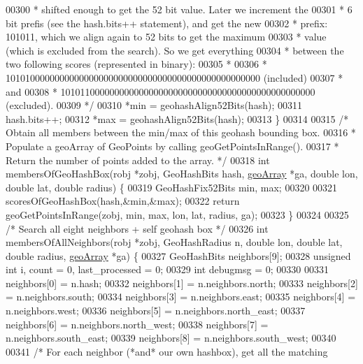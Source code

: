 \begin{DoxyCode}
{{00300 \textcolor{comment}{     * shifted enough to get the 52 bit value. Later we increment the}
00301 \textcolor{comment}{     * 6 bit prefis (see the hash.bits++ statement), and get the new}
00302 \textcolor{comment}{     * prefix: 101011, which we align again to 52 bits to get the maximum}
00303 \textcolor{comment}{     * value (which is excluded from the search). So we get everything}
00304 \textcolor{comment}{     * between the two following scores (represented in binary):}
00305 \textcolor{comment}{     *}
00306 \textcolor{comment}{     * 1010100000000000000000000000000000000000000000000000 (included)}
00307 \textcolor{comment}{     * and}
00308 \textcolor{comment}{     * 1010110000000000000000000000000000000000000000000000 (excluded).}
00309 \textcolor{comment}{     */}
00310     *min = geohashAlign52Bits(hash);
00311     hash.bits++;
00312     *max = geohashAlign52Bits(hash);
00313 \}
00314 
00315 \textcolor{comment}{/* Obtain all members between the min/max of this geohash bounding box.}
00316 \textcolor{comment}{ * Populate a geoArray of GeoPoints by calling geoGetPointsInRange().}
00317 \textcolor{comment}{ * Return the number of points added to the array. */}
00318 \textcolor{keywordtype}{int} membersOfGeoHashBox(robj *zobj, GeoHashBits hash, \hyperlink{structgeoArray}{geoArray} *ga, \textcolor{keywordtype}{double} lon, \textcolor{keywordtype}{double} lat, \textcolor{keywordtype}{
      double} radius) \{
00319     GeoHashFix52Bits min, max;
00320 
00321     scoresOfGeoHashBox(hash,&min,&max);
00322     \textcolor{keywordflow}{return} geoGetPointsInRange(zobj, min, max, lon, lat, radius, ga);
00323 \}
00324 
00325 \textcolor{comment}{/* Search all eight neighbors + self geohash box */}
00326 \textcolor{keywordtype}{int} membersOfAllNeighbors(robj *zobj, GeoHashRadius n, \textcolor{keywordtype}{double} lon, \textcolor{keywordtype}{double} lat, \textcolor{keywordtype}{double} radius, 
      \hyperlink{structgeoArray}{geoArray} *ga) \{
00327     GeoHashBits neighbors[9];
00328     \textcolor{keywordtype}{unsigned} \textcolor{keywordtype}{int} i, count = 0, last\_processed = 0;
00329     \textcolor{keywordtype}{int} debugmsg = 0;
00330 
00331     neighbors[0] = n.hash;
00332     neighbors[1] = n.neighbors.north;
00333     neighbors[2] = n.neighbors.south;
00334     neighbors[3] = n.neighbors.east;
00335     neighbors[4] = n.neighbors.west;
00336     neighbors[5] = n.neighbors.north\_east;
00337     neighbors[6] = n.neighbors.north\_west;
00338     neighbors[7] = n.neighbors.south\_east;
00339     neighbors[8] = n.neighbors.south\_west;
00340 
00341     \textcolor{comment}{/* For each neighbor (*and* our own hashbox), get all the matching}
}}
\end{DoxyCode}
